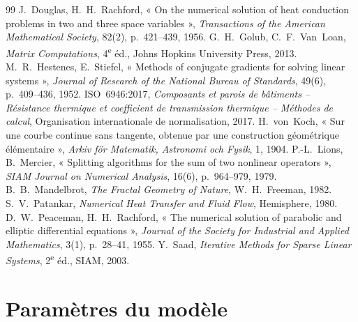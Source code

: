 \documentclass[11pt,a4paper]{article}
\theoremstyle{definition}
\theoremstyle{remark}
\begin{document}
\begin{thebibliography}{99}
 J.~Douglas, H.~H.~Rachford, « On the numerical solution of heat
conduction problems in two and three space variables », \emph{Transactions of the
American Mathematical Society}, 82(2), p.~421--439, 1956.
 G.~H.~Golub, C.~F.~Van~Loan, \emph{Matrix Computations},
4\textsuperscript{e} éd., Johns Hopkins University Press, 2013.
 M.~R.~Hestenes, E.~Stiefel, « Methods of conjugate gradients
for solving linear systems », \emph{Journal of Research of the National Bureau of
Standards}, 49(6), p.~409--436, 1952.
 ISO~6946:2017, \emph{Composants et parois de bâtiments --
Résistance thermique et coefficient de transmission thermique -- Méthodes de
calcul}, Organisation internationale de normalisation, 2017.
 H.~von~Koch, « Sur une courbe continue sans tangente, obtenue par
une construction géométrique élémentaire », \emph{Arkiv för Matematik, Astronomi och
Fysik}, 1, 1904.
 P.-L.~Lions, B.~Mercier, « Splitting algorithms for the sum of two
nonlinear operators », \emph{SIAM Journal on Numerical Analysis}, 16(6),
p.~964--979, 1979.
 B.~B.~Mandelbrot, \emph{The Fractal Geometry of Nature},
W.~H.~Freeman, 1982.
 S.~V.~Patankar, \emph{Numerical Heat Transfer and Fluid
Flow}, Hemisphere, 1980.
 D.~W.~Peaceman, H.~H.~Rachford, « The numerical solution of
parabolic and elliptic differential equations », \emph{Journal of the Society for
Industrial and Applied Mathematics}, 3(1), p.~28--41, 1955.
 Y.~Saad, \emph{Iterative Methods for Sparse Linear Systems},
2\textsuperscript{e} éd., SIAM, 2003.
\end{thebibliography}

\appendix

\section{Paramètres du modèle}
\end{document}

